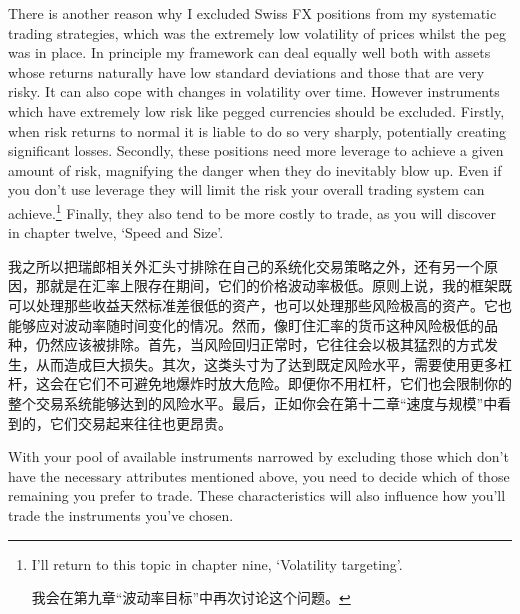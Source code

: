 
\begin{englishblock} There is another reason why I excluded Swiss FX positions from my systematic trading strategies, which was the extremely low volatility of prices whilst the peg was in place. In principle my framework can deal equally well both with assets whose returns naturally have low standard deviations and those that are very risky. It can also cope with changes in volatility over time. However instruments which have extremely low risk like pegged currencies should be excluded. Firstly, when risk returns to normal it is liable to do so very sharply, potentially creating significant losses. Secondly, these positions need more leverage to achieve a given amount of risk, magnifying the danger when they do inevitably blow up. Even if you don't use leverage they will limit the risk your overall trading system can achieve.\footnote{I'll return to this topic in chapter nine, ‘Volatility targeting'. \par 我会在第九章“波动率目标”中再次讨论这个问题。} Finally, they also tend to be more costly to trade, as you will discover in chapter twelve, ‘Speed and Size'. \end{englishblock}

\begin{chineseblock}我之所以把瑞郎相关外汇头寸排除在自己的系统化交易策略之外，还有另一个原因，那就是在汇率上限存在期间，它们的价格波动率极低。原则上说，我的框架既可以处理那些收益天然标准差很低的资产，也可以处理那些风险极高的资产。它也能够应对波动率随时间变化的情况。然而，像盯住汇率的货币这种风险极低的品种，仍然应该被排除。首先，当风险回归正常时，它往往会以极其猛烈的方式发生，从而造成巨大损失。其次，这类头寸为了达到既定风险水平，需要使用更多杠杆，这会在它们不可避免地爆炸时放大危险。即便你不用杠杆，它们也会限制你的整个交易系统能够达到的风险水平。最后，正如你会在第十二章“速度与规模”中看到的，它们交易起来往往也更昂贵。\end{chineseblock}


\begin{englishblock} With your pool of available instruments narrowed by excluding those which don't have the necessary attributes mentioned above, you need to decide which of those remaining you prefer to trade. These characteristics will also influence how you'll trade the instruments you've chosen. \end{englishblock}

